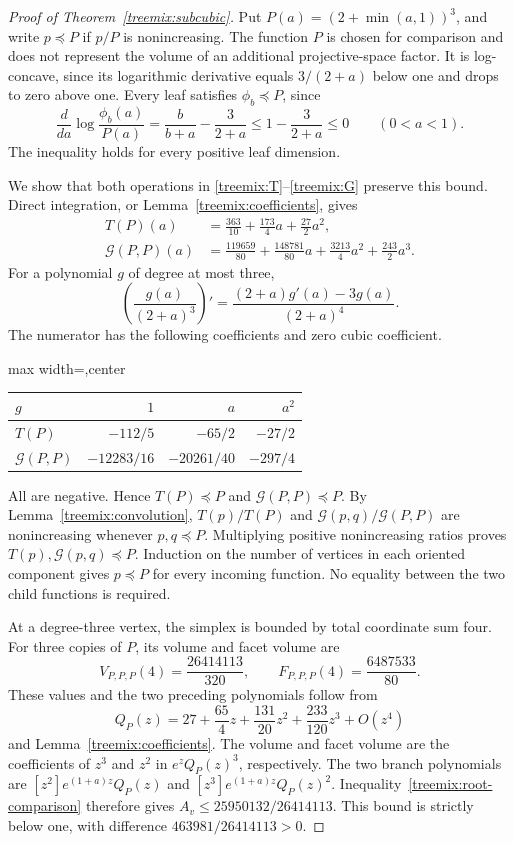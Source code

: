 \begin{proof}[Proof of Theorem~\ref{treemix:subcubic}]
Put $P(a)=(2+\min(a,1))^3$, and write $p\preceq P$ if $p/P$ is
nonincreasing. The function $P$ is chosen for comparison and does not represent the
volume of an additional projective-space factor. It is log-concave,
since its logarithmic derivative equals $3/(2+a)$ below one and
drops to zero above one. Every leaf satisfies $\phi_b\preceq P$, since
\[
 \frac{d}{da}\log\frac{\phi_b(a)}{P(a)}
 =\frac b{b+a}-\frac3{2+a}\le1-\frac3{2+a}\le0
 \qquad(0<a<1).
\]
The inequality holds for every positive leaf dimension.

We show that both operations in \eqref{treemix:T}--\eqref{treemix:G}
preserve this bound. Direct integration, or Lemma~\ref{treemix:coefficients}, gives
\begin{align*}
 T(P)(a)&=\frac{363}{10}+\frac{173}{4}a+\frac{27}{2}a^2,\\
 \mathcal G(P,P)(a)&=\frac{119659}{80}+\frac{148781}{80}a
                  +\frac{3213}{4}a^2+\frac{243}{2}a^3.
\end{align*}
For a polynomial $g$ of degree at most three,
\[
 \left(\frac{g(a)}{(2+a)^3}\right)'
 =\frac{(2+a)g'(a)-3g(a)}{(2+a)^4}.
\]
The numerator has the following coefficients and zero cubic coefficient.
\begin{center}
\begin{adjustbox}{max width=\textwidth,center}
\begin{tabular}{lrrr}
\toprule
$g$ & $1$ & $a$ & $a^2$\\
\midrule
$T(P)$ & $-112/5$ & $-65/2$ & $-27/2$\\
$\mathcal G(P,P)$ & $-12283/16$ & $-20261/40$ & $-297/4$\\
\bottomrule
\end{tabular}
\end{adjustbox}
\end{center}
All are negative. Hence $T(P)\preceq P$ and
$\mathcal G(P,P)\preceq P$. By Lemma~\ref{treemix:convolution},
$T(p)/T(P)$ and $\mathcal G(p,q)/\mathcal G(P,P)$ are nonincreasing
whenever $p,q\preceq P$. Multiplying positive nonincreasing ratios
proves $T(p),\mathcal G(p,q)\preceq P$. Induction on the number of vertices in each oriented component gives
$p\preceq P$ for every incoming function. No equality between the two
child functions is required.

At a degree-three vertex, the simplex is bounded by total coordinate
sum four. For three copies of $P$, its volume and facet volume are
\[
 V_{P,P,P}(4)=\frac{26414113}{320},\qquad
 F_{P,P,P}(4)=\frac{6487533}{80}.
\]
These values and the two preceding polynomials follow from
\[
 Q_P(z)=27+\frac{65}{4}z+\frac{131}{20}z^2
                   +\frac{233}{120}z^3+O(z^4)
\]
and Lemma~\ref{treemix:coefficients}. The volume and facet volume are
the coefficients of $z^3$ and $z^2$ in $e^zQ_P(z)^3$, respectively.
The two branch polynomials are $[z^2]e^{(1+a)z}Q_P(z)$ and
$[z^3]e^{(1+a)z}Q_P(z)^2$.
Inequality~\eqref{treemix:root-comparison} therefore gives
$A_v\le25950132/26414113$. This bound is strictly below one, with
difference $463981/26414113>0$.


\end{proof}
